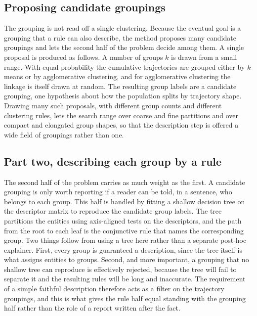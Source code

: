 \subsection{Proposing candidate groupings}
\label{sec:search}

The grouping is not read off a single clustering. Because the eventual goal is a grouping that a rule can also describe, the method proposes many candidate groupings and lets the second half of the problem decide among them. A single proposal is produced as follows. A number of groups $k$ is drawn from a small range. With equal probability the cumulative trajectories are grouped either by $k$-means or by agglomerative clustering, and for agglomerative clustering the linkage is itself drawn at random. The resulting group labels are a candidate grouping, one hypothesis about how the population splits by trajectory shape. Drawing many such proposals, with different group counts and different clustering rules, lets the search range over coarse and fine partitions and over compact and elongated group shapes, so that the description step is offered a wide field of groupings rather than one.

\subsection{Part two, describing each group by a rule}
\label{sec:cost}

The second half of the problem carries as much weight as the first. A candidate grouping is only worth reporting if a reader can be told, in a sentence, who belongs to each group. This half is handled by fitting a shallow decision tree on the descriptor matrix to reproduce the candidate group labels. The tree partitions the entities using axis-aligned tests on the descriptors, and the path from the root to each leaf is the conjunctive rule that names the corresponding group. Two things follow from using a tree here rather than a separate post-hoc explainer. First, every group is guaranteed a description, since the tree itself is what assigns entities to groups. Second, and more important, a grouping that no shallow tree can reproduce is effectively rejected, because the tree will fail to separate it and the resulting rules will be long and inaccurate. The requirement of a simple faithful description therefore acts as a filter on the trajectory groupings, and this is what gives the rule half equal standing with the grouping half rather than the role of a report written after the fact.

